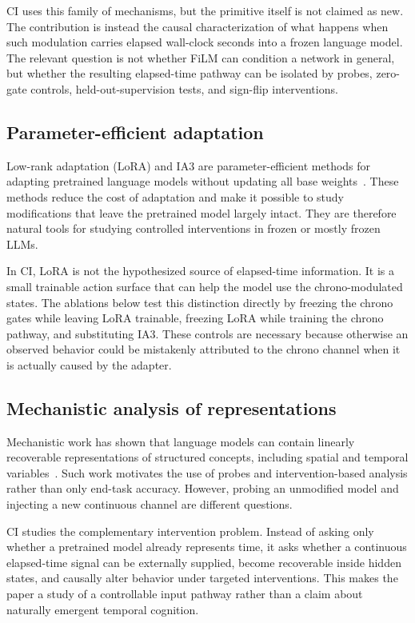 \documentclass[conference,10pt]{IEEEtran}
\newcommand{\CI}{\textsc{CI}}
\begin{document}
\CI{} uses this family of mechanisms, but the primitive itself is not claimed as new. The contribution is instead the causal characterization of what happens when such modulation carries elapsed wall-clock seconds into a frozen language model. The relevant question is not whether FiLM can condition a network in general, but whether the resulting elapsed-time pathway can be isolated by probes, zero-gate controls, held-out-supervision tests, and sign-flip interventions.

\subsection{Parameter-efficient adaptation}

Low-rank adaptation (LoRA) and IA3 are parameter-efficient methods for adapting pretrained language models without updating all base weights~\cite{hu2021lora,liu2022ia3}. These methods reduce the cost of adaptation and make it possible to study modifications that leave the pretrained model largely intact. They are therefore natural tools for studying controlled interventions in frozen or mostly frozen LLMs.

In \CI{}, LoRA is not the hypothesized source of elapsed-time information. It is a small trainable action surface that can help the model use the chrono-modulated states. The ablations below test this distinction directly by freezing the chrono gates while leaving LoRA trainable, freezing LoRA while training the chrono pathway, and substituting IA3. These controls are necessary because otherwise an observed behavior could be mistakenly attributed to the chrono channel when it is actually caused by the adapter.

\subsection{Mechanistic analysis of representations}

Mechanistic work has shown that language models can contain linearly recoverable representations of structured concepts, including spatial and temporal variables~\cite{gurnee2023language}. Such work motivates the use of probes and intervention-based analysis rather than only end-task accuracy. However, probing an unmodified model and injecting a new continuous channel are different questions.

\CI{} studies the complementary intervention problem. Instead of asking only whether a pretrained model already represents time, it asks whether a continuous elapsed-time signal can be externally supplied, become recoverable inside hidden states, and causally alter behavior under targeted interventions. This makes the paper a study of a controllable input pathway rather than a claim about naturally emergent temporal cognition.
\end{document}
